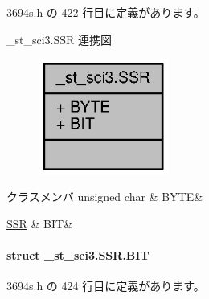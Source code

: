  3694s.\+h の 422 行目に定義があります。



\+\_\+st\+\_\+sci3.\+S\+S\+R 連携図
\nopagebreak
\begin{figure}[H]
\begin{center}
\leavevmode
\includegraphics[width=121pt]{d0/dbc/union__st__sci3_8SSR__coll__graph}
\end{center}
\end{figure}
\begin{DoxyFields}{クラスメンバ}
unsigned char\label{3694s_8h_ae409eb2ba6eb6801f52763ae370c350e}
&
B\+Y\+T\+E&
\\
\hline

\hyperlink{3694s_8h_d1/dd2/struct__st__sci3_8SSR_8BIT}{S\+S\+R}\label{3694s_8h_adb957fdc8000e1eef04a243f5199aa52}
&
B\+I\+T&
\\
\hline

\end{DoxyFields}
\label{struct__st__sci3_8SSR_8BIT}
\paragraph{struct \+\_\+st\+\_\+sci3.\+S\+S\+R.\+B\+I\+T}


 3694s.\+h の 424 行目に定義があります。



